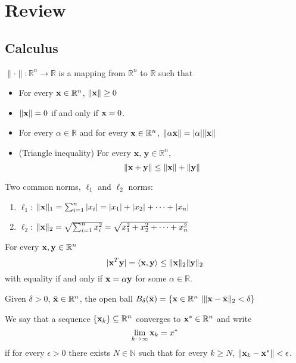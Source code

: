 \section{Review}
\subsection{Calculus}
\begin{definition}[Norm]
  $\| \cdot \|: \mathbb R^n \to \mathbb R$ is a mapping from $\mathbb R^n$ to $\mathbb R$ such that
  \begin{itemize}
    \item For every $\textbf{x} \in \mathbb R^n$, $\| \textbf{x} \| \geq 0$
    \item $\| \textbf{x} \| = 0$ if and only if $\textbf{x} = 0$.
    \item For every $\alpha \in \mathbb R$ and for every $\textbf{x} \in \mathbb R^n$, $\| \alpha \textbf{x} \| = |\alpha| \| \textbf{x} \|$
    \item (Triangle inequality) For every $\textbf{x, y} \in \mathbb R^n$, $$\| \textbf{x} + \textbf{y} \| \leq \| \textbf{x} \| + \| \textbf{y} \|$$
  \end{itemize}
  Two common norms, $\ell_1$ and $\ell_2$ norms:
  \begin{enumerate}
    \item $\ell_1$: $\| \textbf{x} \|_1 = \sum_{i=1}^n |x_i| = |x_1| + |x_2| + \cdots + |x_n|$
    \item $\ell_2$: $\| \textbf{x} \|_2 = \sqrt{\sum_{i=1}^n x_i^2} = \sqrt{x_1^2 + x_2^2 + \cdots + x_n^2}$
  \end{enumerate}
\end{definition}
\begin{proposition}
  For every $\textbf{x},\textbf{y} \in \mathbb R^n$
  $$|\textbf{x}^T \textbf{y}| = \langle \textbf{x}, \textbf{y} \rangle \leq \| \textbf{x} \|_2 \| \textbf{y} \|_2$$
  with equality if and only if $\textbf{x} = \alpha \textbf{y}$ for some $\alpha \in \mathbb R$.
  
\end{proposition}
\begin{definition}
  Given $\delta > 0$, $\bar{\textbf{x}}\in \mathbb{R}^n$, the open ball $B_{\delta}(\bar{\textbf{x}})=\{\textbf{x} \in \mathbb{R}^n\ | \|\textbf{x}-\bar{\textbf{x}}\|_2< \delta\}$
\end{definition}
\begin{definition}
  We say that a sequence $\{\textbf{x}_k\} \subseteq \mathbb R^n$ converges to $\textbf{x}^* \in \mathbb R^n$ and write $$\lim_{k \to \infty} \textbf{x}_k = x^*$$ if for every $\epsilon > 0$ there exists $N \in \mathbb N$ such that for every $k \geq N$, $\| \textbf{x}_k - \textbf{x}^* \| < \epsilon$.
\end{definition}
